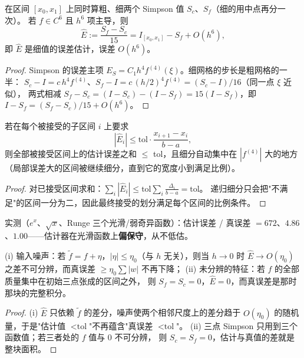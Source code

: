 \begin{theorem}[局部嵌套估计]
\label{thm:adaptive}
在区间 $[x_0,x_1]$ 上同时算粗、细两个 Simpson 值 $S_c$、$S_f$（细的用中点再分一次）。
若 $f\in C^6$ 且 $h^6$ 项主导，则
\[
  \widehat E:=\frac{S_f-S_c}{15}=I_{[x_0,x_1]}-S_f+O(h^6),
\]
即 $\widehat E$ 是细值的误差估计，误差 $O(h^6)$。
\end{theorem}

\begin{proof}
Simpson 的误差主项 $E_S=C_1h^4f^{(4)}(\xi)$。细网格的步长是粗网格的一半：
$S_c-I=c\,h^4f^{(4)}$、$S_f-I=c\,(h/2)^4f^{(4)}=(S_c-I)/16$（同一点 $\xi$ 近似），
两式相减 $S_f-S_c=(I-S_c)-(I-S_f)=15(I-S_f)$，即 $I-S_f=(S_f-S_c)/15+O(h^6)$。
\end{proof}

\begin{theorem}[容差密度准则]
\label{thm:tol}
若在每个被接受的子区间 $i$ 上要求
\[
  |\widehat E_i|\le \text{tol}\cdot\frac{x_{i+1}-x_i}{b-a},
\]
则全部被接受区间上的估计误差之和 $\le$ tol，且细分自动集中在 $|f^{(4)}|$ 大的地方
（局部误差大的区间被继续细分，直到它的宽度小到满足比例）。
\end{theorem}

\begin{proof}
对已接受区间求和：$\sum_i|\widehat E_i|\le\text{tol}\sum_i\frac{\Delta_i}{b-a}=\text{tol}$。
递归细分只会把"不满足"的区间一分为二，因此最终接受的划分满足每个区间的比例条件。
\end{proof}

实测（$e^x$、$\sqrt x$、Runge 三个光滑/弱奇异函数）：估计误差 / 真误差
$=672$、$4.86$、$1.00$——估计器在光滑函数上\textbf{偏保守}，从不低估。

\begin{theorem}[估计器看不见的两样东西]
\label{thm:blind}
(i) 输入噪声：若 $\tilde f=f+\eta$，$|\eta|\le\eta_0$（与 $h$ 无关），则当 $h\to0$ 时
$\widehat E\to O(\eta_0)$ 之差不可分辨，而真误差 $\ge\eta_0\sum|w|$ 不再下降；
(ii) 未分辨的特征：若 $f$ 的全部质量集中在初始三点张成的区间之外，
则 $S_f=S_c=0$，$\widehat E=0$，而真误差是那时那块的完整积分。
\end{theorem}

\begin{proof}
(i) $\widehat E$ 只依赖 $\tilde f$ 的差分，噪声使两个相邻尺度上的差分趋于
$O(\eta_0)$ 的随机量，于是"估计值 $<\text{tol}$"不再蕴含"真误差 $<\text{tol}$"。
(ii) 三点 Simpson 只用到三个函数值；若三者处的 $f$ 值与 0 不可分辨，
则 $S_c=S_f=0$，估计与真值的差就是整块面积。
\end{proof}

